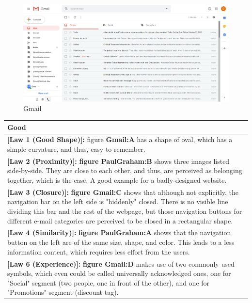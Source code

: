 \documentclass[a4paper,11pt,oneside]{scrreprt}
\begin{document}
\begin{figure}[H]
	\centering
	\includegraphics[clip, trim=0cm 1cm 0cm 0cm, scale=0.38]{./images/gmail1.png}
	\caption{Gmail}
	\label{fig:sub2}
\end{figure}


\clearpage
\begin{tabularx}{\textwidth}{|X|}
	\hline
	\textbf{Good}\\
	\hline
	\textbf{{[Law 1 (Good Shape)]:}} figure \textbf{Gmail:A} has a shape of oval, which has a simple curvature, and thus, easy to remember.\\
	\hline
	\textbf{{[Law 2 (Proximity)]:}} \textbf{figure PaulGraham:B} shows three images listed side-by-side. They are close to each other, and thus, are perceived as belonging together, which is the case. A good example for a badly-designed website.\\
	\hline
	\textbf{{[Law 3 (Closure)]:}} \textbf{figure Gmail:C} shows that although not explicitly, the navigation bar on the left side is "hiddenly" closed. There is no visible line dividing this bar and the rest of the webpage, but those navigation buttons for different e-mail categories are perceived to be closed in a rectangular shape.\\
	\hline
	\textbf{{[Law 4 (Similarity)]:}} \textbf{figure PaulGraham:A} shows that the navigation button on the left are of the same size, shape, and color. This leads to a less information content, which requires less effort from the users.\\
	\hline
	\textbf{{[Law 6 (Experience)]:}} \textbf{figure Gmail:D} makes use of two commonly used symbols, which even could be called universally acknowledged ones, one for "Social" segment (two people, one in front of the other), and one for "Promotions" segment (discount tag).\\
	\hline
\end{tabularx}
\end{document}
